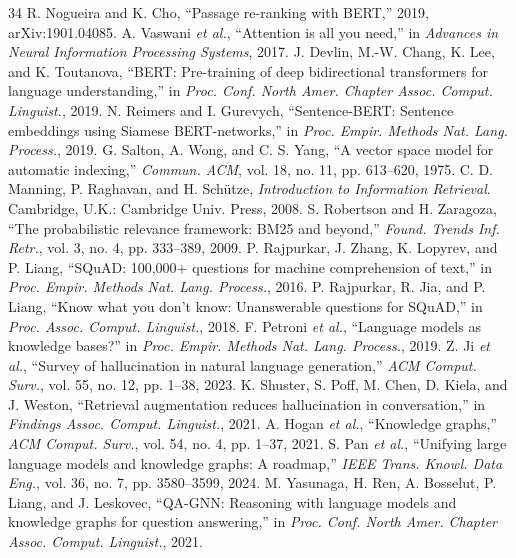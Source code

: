 \documentclass[conference]{IEEEtran}
\begin{document}
\begin{thebibliography}{34}
R. Nogueira and K. Cho, ``Passage re-ranking with BERT,'' 2019, arXiv:1901.04085.
A. Vaswani \emph{et al.}, ``Attention is all you need,'' in \emph{Advances in Neural Information Processing Systems}, 2017.
J. Devlin, M.-W. Chang, K. Lee, and K. Toutanova, ``BERT: Pre-training of deep bidirectional transformers for language understanding,'' in \emph{Proc. Conf. North Amer. Chapter Assoc. Comput. Linguist.}, 2019.
N. Reimers and I. Gurevych, ``Sentence-BERT: Sentence embeddings using Siamese BERT-networks,'' in \emph{Proc. Empir. Methods Nat. Lang. Process.}, 2019.
G. Salton, A. Wong, and C. S. Yang, ``A vector space model for automatic indexing,'' \emph{Commun. ACM}, vol. 18, no. 11, pp. 613--620, 1975.
C. D. Manning, P. Raghavan, and H. Sch\"{u}tze, \emph{Introduction to Information Retrieval}. Cambridge, U.K.: Cambridge Univ. Press, 2008.
S. Robertson and H. Zaragoza, ``The probabilistic relevance framework: BM25 and beyond,'' \emph{Found. Trends Inf. Retr.}, vol. 3, no. 4, pp. 333--389, 2009.
P. Rajpurkar, J. Zhang, K. Lopyrev, and P. Liang, ``SQuAD: 100,000+ questions for machine comprehension of text,'' in \emph{Proc. Empir. Methods Nat. Lang. Process.}, 2016.
P. Rajpurkar, R. Jia, and P. Liang, ``Know what you don't know: Unanswerable questions for SQuAD,'' in \emph{Proc. Assoc. Comput. Linguist.}, 2018.
F. Petroni \emph{et al.}, ``Language models as knowledge bases?'' in \emph{Proc. Empir. Methods Nat. Lang. Process.}, 2019.
Z. Ji \emph{et al.}, ``Survey of hallucination in natural language generation,'' \emph{ACM Comput. Surv.}, vol. 55, no. 12, pp. 1--38, 2023.
K. Shuster, S. Poff, M. Chen, D. Kiela, and J. Weston, ``Retrieval augmentation reduces hallucination in conversation,'' in \emph{Findings Assoc. Comput. Linguist.}, 2021.
A. Hogan \emph{et al.}, ``Knowledge graphs,'' \emph{ACM Comput. Surv.}, vol. 54, no. 4, pp. 1--37, 2021.
S. Pan \emph{et al.}, ``Unifying large language models and knowledge graphs: A roadmap,'' \emph{IEEE Trans. Knowl. Data Eng.}, vol. 36, no. 7, pp. 3580--3599, 2024.
M. Yasunaga, H. Ren, A. Bosselut, P. Liang, and J. Leskovec, ``QA-GNN: Reasoning with language models and knowledge graphs for question answering,'' in \emph{Proc. Conf. North Amer. Chapter Assoc. Comput. Linguist.}, 2021.

\end{thebibliography}
\end{document}
